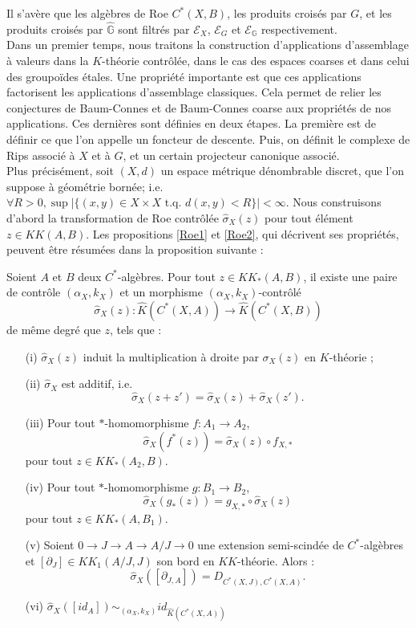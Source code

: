 Il s'avère que les algèbres de Roe $C^*(X,B)$, les produits croisés par $G$, et les produits croisés par $\hat{\mathbb G}$ sont filtrés par $\mathcal E_X$, $\mathcal E_G$ et $\mathcal E_{\mathbb G}$ respectivement.\\


Dans un premier temps, nous traitons la construction d'applications d'assemblage à valeurs dans la $K$-théorie contrôlée, dans le cas des espaces coarses et dans celui des groupoïdes étales. Une propriété importante est que ces applications factorisent les applications d'assemblage classiques. Cela permet de relier les conjectures de Baum-Connes et de Baum-Connes coarse aux propriétés de nos applications. Ces dernières sont définies en deux étapes. La première est de définir ce que l'on appelle un foncteur de descente. Puis, on définit le complexe de Rips associé à $X$ et à $G$, et un certain projecteur canonique associé. \\

Plus précisément, soit $(X,d)$ un espace métrique dénombrable discret, que l'on suppose à géométrie bornée; i.e. $\forall R>0,\sup | \{ (x,y) \in X\times X \text{ t.q. }d(x,y)<R\} |<\infty$. Nous construisons d'abord la transformation de Roe contrôlée $\hat\sigma_X(z)$ pour tout élément $z\in KK(A,B)$. Les propositions \ref{Roe1} et \ref{Roe2}, qui décrivent ses propriétés, peuvent être résumées dans la proposition suivante :

\begin{propfr}
Soient $A$ et $B$ deux $C^*$-algèbres. Pour tout $z\in KK_*(A,B)$, il existe une paire de contrôle $(\alpha_X,k_X)$ et un morphisme $(\alpha_X,k_X)$-contrôlé
\[\hat\sigma_X(z) : \hat K(C^*(X,A))\rightarrow \hat K(C^*(X,B))\]
de même degré que $z$, tels que :
\begin{enumerate}
\item[(i)] $\hat\sigma_X(z)$ induit la multiplication à droite par $\sigma_X(z)$ en $K$-théorie ;
\item[(ii)] $\hat\sigma_X$ est additif, i.e.
\[\hat\sigma_X(z+z')=\hat\sigma_X(z)+\hat\sigma_X(z').\]
\item[(iii)] Pour tout $*$-homomorphisme $f : A_1\rightarrow A_2$,
\[\hat\sigma_X(f^*(z))=\hat\sigma_X(z)\circ f_{X,*}\] pour tout $z\in KK_*(A_2,B)$.
\item[(iv)] Pour tout $*$-homomorphisme $g : B_1\rightarrow B_2$,
\[\hat\sigma_X(g_*(z))= g_{X,*}\circ \hat\sigma_X(z)\] pour tout $z\in KK_*(A,B_1)$.
\item[(v)] Soient $0\rightarrow J\rightarrow A\rightarrow A/J\rightarrow 0$ une extension semi-scindée de $C^*$-algèbres et $[\partial_J]\in KK_1(A/J,J)$ son bord en $KK$-théorie. Alors : 
\[\hat\sigma_X([\partial_{J,A}])=D_{C^*(X,J),C^*(X,A)}.\] 
\item[(vi)] $\hat\sigma_X([id_A]) \sim_{(\alpha_X,k_X)} id_{\hat K(C^*(X,A))}$
\end{enumerate}
\end{propfr}

